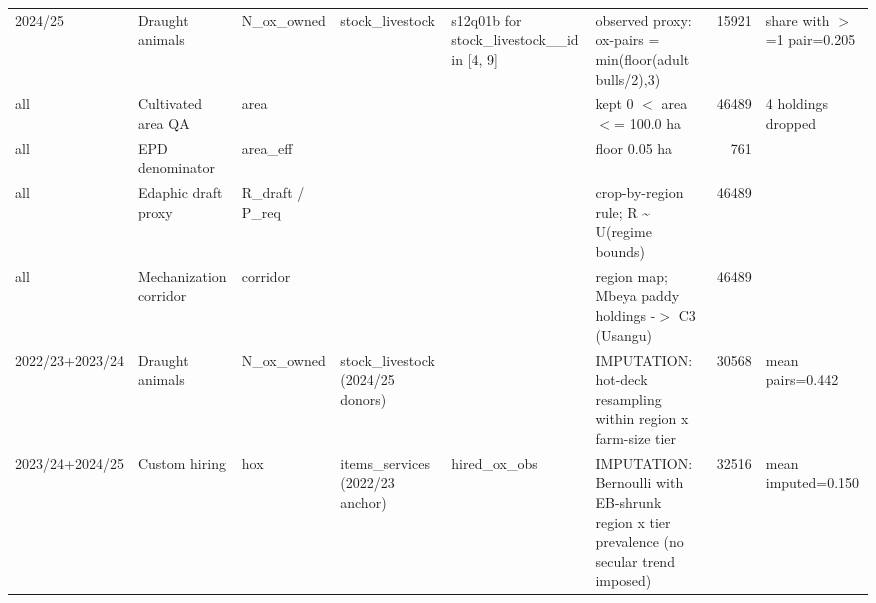\begin{tabular}{llllllrl}
 2024/25         & Draught animals           & N\_ox\_owned                & stock\_livestock                  & s12q01b for stock\_livestock\_\_id in [4, 9] & observed proxy: ox-pairs = min(floor(adult bulls/2),3)                                                       &   15921 & share with \ensuremath{>}=1 pair=0.205                                                                      \\
 all             & Cultivated area QA        & area                      &                                  &                                           & kept 0 \ensuremath{<} area \ensuremath{<}= 100.0 ha                                                                                    &   46489 & 4 holdings dropped                                                                             \\
 all             & EPD denominator           & area\_eff                  &                                  &                                           & floor 0.05 ha                                                                                                &     761 &                                                                                                \\
 all             & Edaphic draft proxy       & R\_draft / P\_req           &                                  &                                           & crop-by-region rule; R \textasciitilde{} U(regime bounds)                                                                    &   46489 &                                                                                                \\
 all             & Mechanization corridor    & corridor                  &                                  &                                           & region map; Mbeya paddy holdings -\ensuremath{>} C3 (Usangu)                                                              &   46489 &                                                                                                \\
 2022/23+2023/24 & Draught animals           & N\_ox\_owned                & stock\_livestock (2024/25 donors) &                                           & IMPUTATION: hot-deck resampling within region x farm-size tier                                               &   30568 & mean pairs=0.442                                                                               \\
 2023/24+2024/25 & Custom hiring             & hox                       & items\_services (2022/23 anchor)  & hired\_ox\_obs                              & IMPUTATION: Bernoulli with EB-shrunk region x tier prevalence (no secular trend imposed)                     &   32516 & mean imputed=0.150                                                                             \\

\end{tabular}
